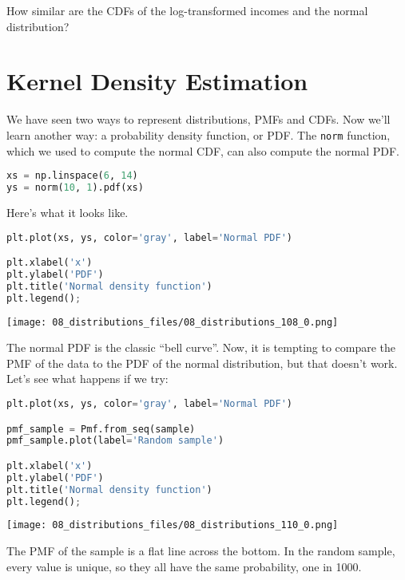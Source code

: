 How similar are the CDFs of the log-transformed incomes and the normal
distribution?

\section{Kernel Density Estimation}\label{kernel-density-estimation}

We have seen two ways to represent distributions, PMFs and CDFs. Now
we'll learn another way: a probability density function, or PDF. The
\passthrough{\lstinline!norm!} function, which we used to compute the
normal CDF, can also compute the normal PDF.

\begin{lstlisting}[language=Python,style=source]
xs = np.linspace(6, 14)
ys = norm(10, 1).pdf(xs)
\end{lstlisting}

Here's what it looks like.

\begin{lstlisting}[language=Python,style=source]
plt.plot(xs, ys, color='gray', label='Normal PDF')

plt.xlabel('x')
plt.ylabel('PDF')
plt.title('Normal density function')
plt.legend();
\end{lstlisting}

\begin{center}
\texttt{[image: 08\_distributions\_files/08\_distributions\_108\_0.png]}
\end{center}

The normal PDF is the classic ``bell curve''. Now, it is tempting to
compare the PMF of the data to the PDF of the normal distribution, but
that doesn't work. Let's see what happens if we try:

\begin{lstlisting}[language=Python,style=source]
plt.plot(xs, ys, color='gray', label='Normal PDF')

pmf_sample = Pmf.from_seq(sample)
pmf_sample.plot(label='Random sample')

plt.xlabel('x')
plt.ylabel('PDF')
plt.title('Normal density function')
plt.legend();
\end{lstlisting}

\begin{center}
\texttt{[image: 08\_distributions\_files/08\_distributions\_110\_0.png]}
\end{center}

The PMF of the sample is a flat line across the bottom. In the random
sample, every value is unique, so they all have the same probability,
one in 1000.

